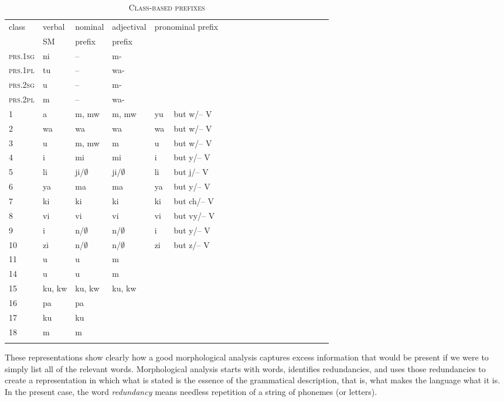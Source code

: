 \documentclass[output=paper,colorlinks,citecolor=brown]{langscibook}
\begin{document}
\begin{table}
\begin{tabular}{lllllllllllllllllll}\lsptoprule
class & verbal & nominal & adjectival   & \multicolumn{2}{l}{pronominal prefix} \\
&SM & prefix & prefix\\ \midrule
\textsc{prs.1sg} & ni &  --  & m- \\
\textsc{prs.1pl} & tu & --  & wa- \\
\textsc{prs.2sg} & u & --  &m-  \\
\textsc{prs.2pl} & m & -- & wa- \\
1 & a & m, mw  & m, mw & yu & but w\slash -- V \\
2 & wa & wa & wa & wa & but w\slash -- V\\
3 & u & m, mw & m & u&  but w\slash -- V \\
4 & i & mi & mi & i& but y\slash -- V  \\
5 & li & ji/$\emptyset$ & ji/$\emptyset$ & li & but j\slash -- V  \\
6 & ya & ma & ma & ya & but y\slash -- V  \\
7 & ki &ki & ki & ki & but ch\slash -- V \\
8 & vi & vi & vi & vi & but vy\slash -- V  \\
9 & i & n/$\emptyset$ & n/$\emptyset$  & i & but y\slash -- V  \\
10 & zi & n/$\emptyset$ & n/$\emptyset$  & zi & but z\slash -- V    \\
11 & u & u  & m  \\
14 & u & u & m \\
15 & ku, kw & ku, kw  & ku, kw\\ 
16 & pa & pa\\
17 & ku & ku \\
18 & m & m \\
\lspbottomrule
\end{tabular}
\caption{\textsc{Class-based prefixes}}
\label{class-based-system}
\end{table}
 
  
These representations show clearly how a good morphological analysis captures excess information that would be present if we were to simply list all of the relevant words. Morphological analysis starts with words, identifies redundancies, and uses those redundancies to create a representation in which what is stated is the essence of the grammatical description, that is, what makes the language what it is. In the present case, the word \textit{redundancy} means needless repetition of a string of phonemes (or letters).
\end{document}
